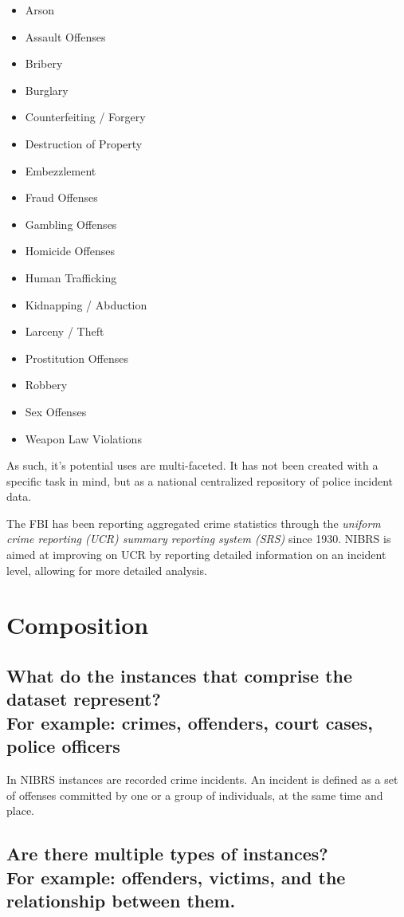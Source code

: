 \documentclass[letterpaper, 10 pt, conference]{ieeeconf}  %
\newcommand{\subtitle}[1]{{\\ \small \normalfont \color{purple} #1}}
\begin{document}
\begin{itemize}
    \item Arson
    \item Assault Offenses
    \item Bribery
    \item Burglary
    \item Counterfeiting / Forgery
    \item Destruction of Property
    \item Embezzlement
    \item Fraud Offenses
    \item Gambling Offenses
    \item Homicide Offenses
    \item Human Trafficking
    \item Kidnapping / Abduction
    \item Larceny / Theft
    \item Prostitution Offenses
    \item Robbery
    \item Sex Offenses
    \item Weapon Law Violations
\end{itemize}

As such, it's potential uses are multi-faceted. It has not been created with a specific task in mind, but as a national centralized repository of police incident data.

The FBI has been reporting aggregated crime statistics through the \textit{uniform crime reporting (UCR) summary reporting system (SRS)} since 1930. NIBRS is aimed at improving on UCR by reporting detailed information on an incident level, allowing for more detailed analysis.

\section{Composition}

\subsection{What do the instances that comprise the dataset represent? \subtitle{For example: crimes, offenders, court cases, police officers}}

In NIBRS instances are recorded crime incidents. An incident is defined as a set of offenses committed by one or a group of individuals, at the same time and place. 

\subsection{Are there multiple types of instances? \subtitle{For example: offenders, victims, and the relationship between them.}}
\end{document}

